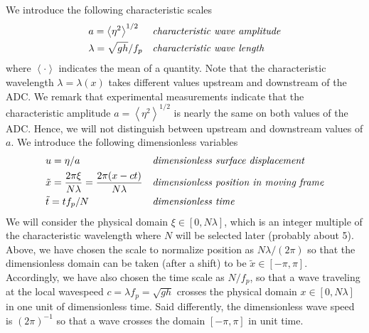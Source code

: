 \documentclass[11pt]{article}
\newcommand{\mean}[1]{\left< #1 \right>}
\newcommand{\depth}{h}
\newcommand{\freqp}{f_p}
\newcommand{\lam}{\lambda}
\newcommand{\lamfac}{N}
\newcommand{\amp}{a}
\begin{document}
We introduce the following characteristic scales
\begin{align}
\label{ampdefn}
&\amp = \mean{\eta^2}^{1/2} 
&&\mbox{\em characteristic wave amplitude} \\
\label{lamdefn}
&\lam = \sqrt{g \depth} / \freqp
&&\mbox{\em characteristic wave length}
\end{align}
where $\mean{\cdot}$ indicates the mean of a quantity. Note that the characteristic wavelength $\lam = \lam(x)$ takes different values upstream and downstream of the ADC. We remark that experimental measurements indicate that the characteristic amplitude $\amp = \mean{\eta^2}^{1/2}$ is nearly the same on both values of the ADC. Hence, we will not distinguish between upstream and downstream values of $\amp$.
We introduce the following dimensionless variables
\begin{align}
&u = \eta/\amp
&&\mbox{\em dimensionless surface displacement} \\
&\tilde{x} = \frac{2 \pi \xi}{\lamfac \lam} = \frac{2 \pi (x-ct)}{\lamfac \lam}
&&\mbox{\em dimensionless position in moving frame} \\
& \tilde{t} = t \freqp / \lamfac
&&\mbox{\em dimensionless time}
\end{align}
We will consider the physical domain $\xi \in [0, \lamfac \lam]$, which is an integer multiple of the characteristic wavelength where $\lamfac$ will be selected later (probably about 5). Above, we have chosen the scale to normalize position as $\lamfac \lam/(2\pi)$ so that the dimensionless domain can be taken (after a shift) to be $\tilde{x} \in [-\pi,\pi]$. Accordingly, we have also chosen the time scale as $\lamfac/\freqp$, so that a wave traveling at the local wavespeed $c = \lam \freqp = \sqrt{g \depth}$ crosses the physical domain $x \in [0, \lamfac \lam]$ in one unit of dimensionless time. Said differently, the dimensionless wave speed is $(2 \pi)^{-1}$ so that a wave crosses the domain $[-\pi,\pi]$ in unit time.
\end{document}

